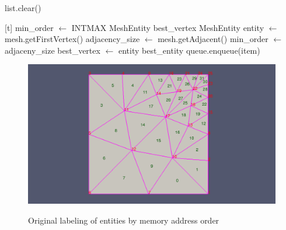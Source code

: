 \documentclass{article}
\begin{document}
\begin{algorithm}
\begin{algorithmic}

            \State {}
            \State list.clear()

        \EndIf

    \EndWhile
\EndProcedure
\State
{}[t]
    \State{}
    \State min\_order $\gets$ INTMAX
    \State MeshEntity best\_vertex
    \State MeshEntity entity $\gets$ mesh.getFirstVertex()
            \State adjacency\_size $\gets$ mesh.getAdjacent()
                \State min\_order $\gets$ adjaceny\_size
                \State best\_vertex $\gets$ entity
            \EndIf
        \EndIf
    \EndWhile
    \State\Return best\_entity
\EndProcedure
\State
{}
            \State queue.enqueue(item)
        \EndIf
    \EndFor
\EndProcedure

\end{algorithmic}
\end{algorithm}

\FloatBarrier

\begin{figure}[ht]
\caption{Original labeling of entities by memory address order}
{\includegraphics[width = 15cm ]{pre_b}}
\centering
\end{figure}
\end{document}
